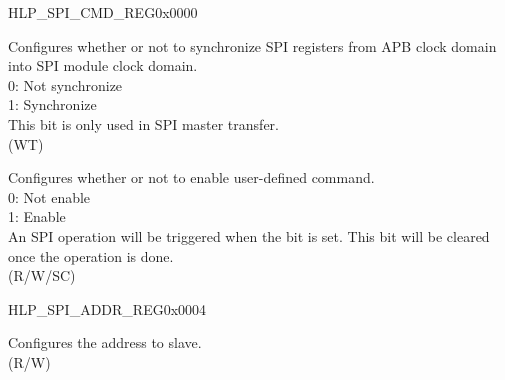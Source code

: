 \begin{register}{H}{LP\_SPI\_CMD\_REG}{0x0000}\label{regdesc:LPSPICMDREG}
%
%
%
%
\regnewline%
\begin{regdesc}\begin{reglist}
\label{fielddesc:LPSPIUPDATE}\item [LP\_SPI\_UPDATE] Configures whether or not to synchronize SPI registers from APB clock domain into SPI module clock domain. \\
0: Not synchronize \\
1: Synchronize \\
This bit is only used in SPI master transfer.\\
(WT)
\label{fielddesc:LPSPIUSR}\item [LP\_SPI\_USR] Configures whether or not to enable user-defined command. \\
0: Not enable \\
1: Enable \\
An SPI operation will be triggered when the bit is set. This bit will be cleared once the operation is done. \\
(R/W/SC)
\end{reglist}\end{regdesc}
\end{register}


\begin{register}{H}{LP\_SPI\_ADDR\_REG}{0x0004}\label{regdesc:LPSPIADDRREG}
%
\regnewline%
\begin{regdesc}\begin{reglist}
\label{fielddesc:LPSPIUSRADDRVALUE}\item [LP\_SPI\_USR\_ADDR\_VALUE] Configures the address to slave.\\
 (R/W)
\end{reglist}\end{regdesc}
\end{register}


